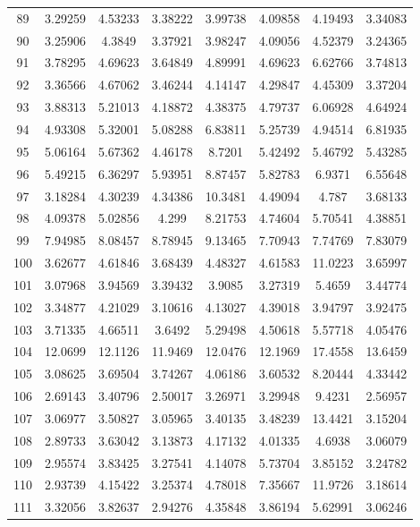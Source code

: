 \begin{center}
\begin{longtable}{cccccccc}
89 & 3.29259 & 4.53233 & 3.38222 & 3.99738 & 4.09858 & 4.19493 & 3.34083\\
90 & 3.25906 & 4.3849 & 3.37921 & 3.98247 & 4.09056 & 4.52379 & 3.24365\\
91 & 3.78295 & 4.69623 & 3.64849 & 4.89991 & 4.69623 & 6.62766 & 3.74813\\
92 & 3.36566 & 4.67062 & 3.46244 & 4.14147 & 4.29847 & 4.45309 & 3.37204\\
93 & 3.88313 & 5.21013 & 4.18872 & 4.38375 & 4.79737 & 6.06928 & 4.64924\\
94 & 4.93308 & 5.32001 & 5.08288 & 6.83811 & 5.25739 & 4.94514 & 6.81935\\
95 & 5.06164 & 5.67362 & 4.46178 & 8.7201 & 5.42492 & 5.46792 & 5.43285\\
96 & 5.49215 & 6.36297 & 5.93951 & 8.87457 & 5.82783 & 6.9371 & 6.55648\\
97 & 3.18284 & 4.30239 & 4.34386 & 10.3481 & 4.49094 & 4.787 & 3.68133\\
98 & 4.09378 & 5.02856 & 4.299 & 8.21753 & 4.74604 & 5.70541 & 4.38851\\
99 & 7.94985 & 8.08457 & 8.78945 & 9.13465 & 7.70943 & 7.74769 & 7.83079\\
100 & 3.62677 & 4.61846 & 3.68439 & 4.48327 & 4.61583 & 11.0223 & 3.65997\\
101 & 3.07968 & 3.94569 & 3.39432 & 3.9085 & 3.27319 & 5.4659 & 3.44774\\
102 & 3.34877 & 4.21029 & 3.10616 & 4.13027 & 4.39018 & 3.94797 & 3.92475\\
103 & 3.71335 & 4.66511 & 3.6492 & 5.29498 & 4.50618 & 5.57718 & 4.05476\\
104 & 12.0699 & 12.1126 & 11.9469 & 12.0476 & 12.1969 & 17.4558 & 13.6459\\
105 & 3.08625 & 3.69504 & 3.74267 & 4.06186 & 3.60532 & 8.20444 & 4.33442\\
106 & 2.69143 & 3.40796 & 2.50017 & 3.26971 & 3.29948 & 9.4231 & 2.56957\\
107 & 3.06977 & 3.50827 & 3.05965 & 3.40135 & 3.48239 & 13.4421 & 3.15204\\
108 & 2.89733 & 3.63042 & 3.13873 & 4.17132 & 4.01335 & 4.6938 & 3.06079\\
109 & 2.95574 & 3.83425 & 3.27541 & 4.14078 & 5.73704 & 3.85152 & 3.24782\\
110 & 2.93739 & 4.15422 & 3.25374 & 4.78018 & 7.35667 & 11.9726 & 3.18614\\
111 & 3.32056 & 3.82637 & 2.94276 & 4.35848 & 3.86194 & 5.62991 & 3.06246\\

\end{longtable}
\end{center}

